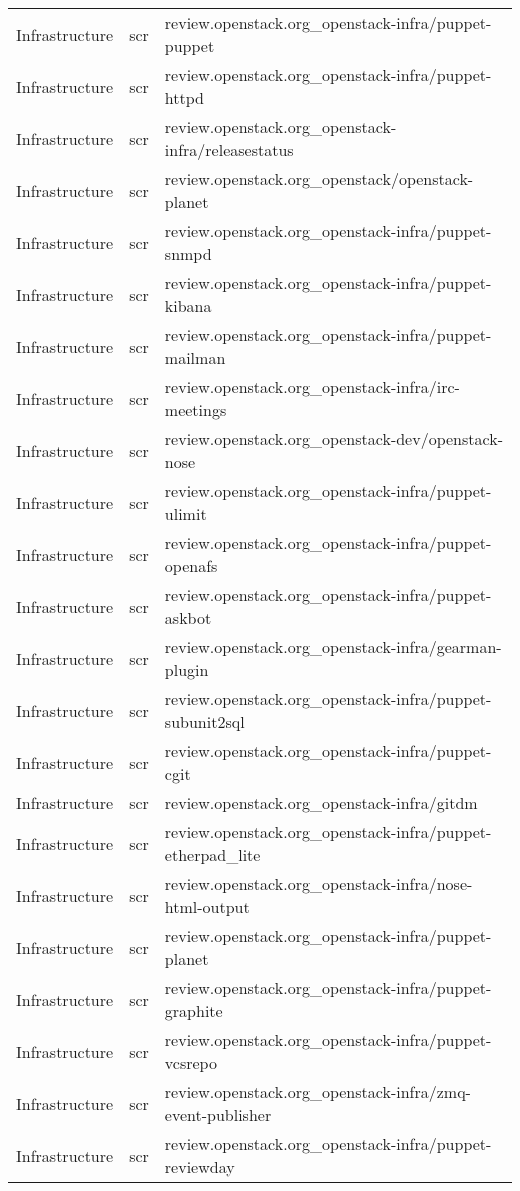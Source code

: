 \begin{center}
\begin{longtable}{|p{4cm}|p{1cm}|p{10cm}|}
Infrastructure&scr&review.openstack.org\_openstack-infra/puppet-puppet\\ 
Infrastructure&scr&review.openstack.org\_openstack-infra/puppet-httpd\\ 
Infrastructure&scr&review.openstack.org\_openstack-infra/releasestatus\\ 
Infrastructure&scr&review.openstack.org\_openstack/openstack-planet\\ 
Infrastructure&scr&review.openstack.org\_openstack-infra/puppet-snmpd\\ 
Infrastructure&scr&review.openstack.org\_openstack-infra/puppet-kibana\\ 
Infrastructure&scr&review.openstack.org\_openstack-infra/puppet-mailman\\ 
Infrastructure&scr&review.openstack.org\_openstack-infra/irc-meetings\\ 
Infrastructure&scr&review.openstack.org\_openstack-dev/openstack-nose\\ 
Infrastructure&scr&review.openstack.org\_openstack-infra/puppet-ulimit\\ 
Infrastructure&scr&review.openstack.org\_openstack-infra/puppet-openafs\\ 
Infrastructure&scr&review.openstack.org\_openstack-infra/puppet-askbot\\ 
Infrastructure&scr&review.openstack.org\_openstack-infra/gearman-plugin\\ 
Infrastructure&scr&review.openstack.org\_openstack-infra/puppet-subunit2sql\\ 
Infrastructure&scr&review.openstack.org\_openstack-infra/puppet-cgit\\ 
Infrastructure&scr&review.openstack.org\_openstack-infra/gitdm\\ 
Infrastructure&scr&review.openstack.org\_openstack-infra/puppet-etherpad\_lite\\ 
Infrastructure&scr&review.openstack.org\_openstack-infra/nose-html-output\\ 
Infrastructure&scr&review.openstack.org\_openstack-infra/puppet-planet\\ 
Infrastructure&scr&review.openstack.org\_openstack-infra/puppet-graphite\\ 
Infrastructure&scr&review.openstack.org\_openstack-infra/puppet-vcsrepo\\ 
Infrastructure&scr&review.openstack.org\_openstack-infra/zmq-event-publisher\\ 
Infrastructure&scr&review.openstack.org\_openstack-infra/puppet-reviewday\\ 

\end{longtable}
\end{center}

